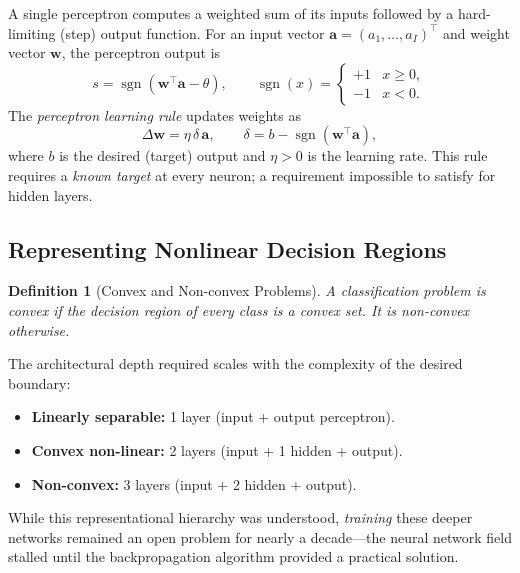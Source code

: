 \documentclass[12pt,a4paper]{article}
\newtheorem{definition}{Definition}[section]
\begin{document}
A single perceptron computes a weighted sum of its inputs followed by a
hard-limiting (step) output function.  For an input vector
$\mathbf{a} = (a_1, \ldots, a_I)^{\top}$ and weight vector $\mathbf{w}$, the
perceptron output is
\begin{equation}
  s = \operatorname{sgn}\!\left(\mathbf{w}^{\top}\mathbf{a} - \theta\right),
  \qquad \operatorname{sgn}(x) =
  \begin{cases} +1 & x \geq 0, \\ -1 & x < 0. \end{cases}
  \label{eq:perceptron}
\end{equation}
The \emph{perceptron learning rule} updates weights as
\begin{equation}
  \Delta \mathbf{w} = \eta\,\delta\,\mathbf{a},
  \qquad \delta = b - \operatorname{sgn}(\mathbf{w}^{\top}\mathbf{a}),
  \label{eq:percep-learning}
\end{equation}
where $b$ is the desired (target) output and $\eta > 0$ is the learning rate.
This rule requires a \emph{known target} at every neuron; a requirement
impossible to satisfy for hidden layers.

\subsection{Representing Nonlinear Decision Regions}
\label{subsec:nonlinear}

\begin{definition}[Convex and Non-convex Problems]
  \label{def:convex}
  A classification problem is \emph{convex} if the decision region of every
  class is a convex set.  It is \emph{non-convex} otherwise.
\end{definition}

The architectural depth required scales with the complexity of the desired
boundary:
\begin{itemize}
  \item \textbf{Linearly separable:} 1 layer (input + output perceptron).
  \item \textbf{Convex non-linear:} 2 layers (input + 1 hidden + output).
  \item \textbf{Non-convex:} 3 layers (input + 2 hidden + output).
\end{itemize}

While this representational hierarchy was understood, \emph{training} these
deeper networks remained an open problem for nearly a decade---the neural
network field stalled until the backpropagation algorithm provided a
practical solution.
\end{document}
